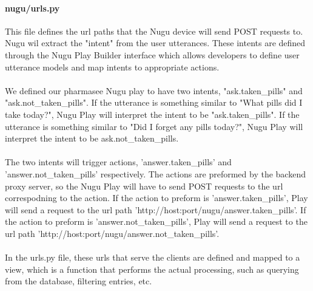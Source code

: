 \documentclass[conference]{IEEEtran}
\begin{document}
\paragraph{nugu/urls.py}
This file defines the url paths that the Nugu device will send POST requests to. Nugu wil extract the "intent" from the user utterances. These intents are defined through the Nugu Play Builder interface which allows developers to define user utterance models and map intents to appropriate actions. \\ \\
We defined our pharmasee Nugu play to have two intents, "ask.taken\_pills" and "ask.not\_taken\_pills". If the utterance is something similar to "What pills did I take today?", Nugu Play will interpret the intent to be "ask.taken\_pills". If the utterance is something similar to "Did I forget any pills today?", Nugu Play will interpret the intent to be ask.not\_taken\_pills. \\ \\
The two intents will trigger actions, 'answer.taken\_pills' and 'answer.not\_taken\_pills' respectively. The actions are preformed by the backend proxy server, so the Nugu Play will have to send POST requests to the url correspodning to the action. If the action to preform is 'answer.taken\_pills', Play will send a request to the url path 'http://host:port/nugu/answer.taken\_pills'.  If the action to preform is 'answer.not\_taken\_pills', Play will send a request to the url path 'http://host:port/nugu/answer.not\_taken\_pills'. \\ \\
In the urls.py file, these urls that serve the clients are defined and mapped to a view, which is a function that performs the actual processing, such as querying from the database, filtering entries, etc.\\ 
\end{document}

